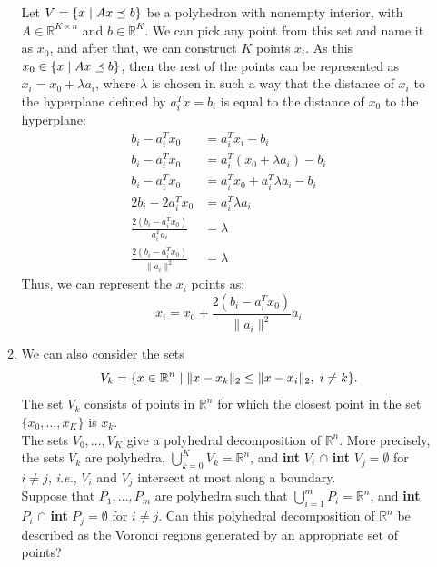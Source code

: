 \documentclass[12pt, oneside]{article}%
\def\R{{\mathbb R}}
\begin{document}
\begin{enumerate}[font=\bfseries]
\begin{enumerate}
    Let $V=\{x\hspace{0.1cm}|\hspace{0.1cm} Ax \preceq b\}$ be a polyhedron with nonempty interior, with $A\in \R ^{K \times n}$ and $b\in \R ^K$. We can pick any point from this set and name it as $x_0$, and after that, we can construct $K$ points $x_i$. As this $x_0 \in \{x\hspace{0.1cm}|\hspace{0.1cm} Ax \preceq b\}$, then the rest of the points can be represented as $x_i=x_0+\lambda a_i$, where $\lambda$ is chosen in such a way that the distance of $x_i$ to the hyperplane defined by $a_i^T x = b_i$ is equal to the distance of $x_0$ to the hyperplane:
    \begin{align*}
        b_i-a_i^T x_0 &= a_i^T x_i - b_i\\
        b_i-a_i^T x_0 &= a_i^T (x_0+\lambda a_i) - b_i\\
        b_i-a_i^T x_0 &= a_i^T x_0+ a_i^T\lambda a_i - b_i\\
        2b_i-2a_i^T x_0 &= a_i^T\lambda a_i\\
        \frac{2(b_i-a_i^T x_0)}{a_i^T a_i} &= \lambda\\
        \frac{2(b_i-a_i^T x_0)}{\|a_i\|^2} &= \lambda
    \end{align*}
    Thus, we can represent the $x_i$ points as:
    $$ x_i = x_0 + \frac{2(b_i-a_i^T x_0)}{\|a_i\|^2} a_i $$
    \item We can also consider the sets
    $$V_k = \{x \in \R^n\hspace{0.1cm} |\hspace{0.1cm} \|x-x_k\|_2 \leq \|x-x_i\|_2,\hspace{0.1cm} i \neq k\}.$$
    The set $V_k$ consists of points in $\R^n$ for which the closest point in the set $\{x_0,\dots, x_K\}$ is $x_k$.\\
    
    The sets $V_0,\dots, V_K$ give a polyhedral decomposition of $\R^n$. More precisely, the sets $V_k$ are polyhedra, $\bigcup_{k=0}^K V_k = \R^n$, and \textbf{int} $V_i$ $\cap $ \textbf{int} $V_j = \emptyset$ for $i \neq j$, \textit{i.e.}, $V_i$ and $V_j$ intersect at most along a boundary. \\
    Suppose that $P_1,\dots, P_m$ are polyhedra such that $\bigcup^m_{i=1} P_i = \R^n$, and \textbf{int} $P_i$ $\cap $ \textbf{int} $P_j = \emptyset$ for $i \neq j$. Can this polyhedral decomposition of $\R^n$ be described as the Voronoi regions generated by an appropriate set of points?\\
    

\end{enumerate}
\end{enumerate}
\end{document}
